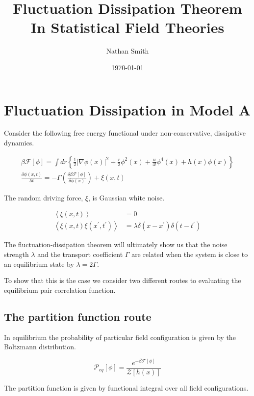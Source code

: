 \documentclass[11pt]{article}
\title{\textbf{Fluctuation Dissipation Theorem In Statistical Field Theories}}
\author{Nathan Smith}
\date{\today}
\newcommand{\F}{\mathcal{F}}
\newcommand{\f}{\frac}
\renewcommand{\l}{\left}
\renewcommand{\r}{\right}
\begin{document}
\maketitle
\tableofcontents

\section{Fluctuation Dissipation in Model A}

Consider the following free energy functional under non-conservative, dissipative dynamics. 

\begin{gather}
\beta \F[\phi] = \int dr \left\lbrace \f{1}{2}\vert \nabla \phi(x) \vert^2 + \f{r}{2}\phi^2(x) + \f{u}{4!}\phi^4(x)  + h(x)\phi(x)\right\rbrace \\
\f{\partial \phi(x,t)}{\partial t} = -\Gamma \left(\f{\delta \beta \F[\phi]}{\delta \phi(x)}\right) + \xi(x, t) 
\end{gather}

The random driving force, $\xi$, is Gaussian white noise. 

\begin{align}
\l\langle \xi (x, t) \r\rangle &= 0 \\
\l\langle \xi (x, t) \xi(x^\prime, t^\prime) \r\rangle  &= \lambda \delta(x - x^\prime) \delta (t - t^\prime)
\end{align}

The fluctuation-dissipation theorem will ultimately show us that the noise strength $\lambda$ and the transport coefficient $\Gamma$ are related when the system is close to an equilibrium state by $\lambda = 2\Gamma$.

To show that this is the case we consider two different routes to evaluating the equilibrium pair correlation function. 

\subsection{The partition function route}

In equilibrium the probability of particular field configuration is given by the Boltzmann distribution. 

\begin{equation}
\mathcal{P}_{eq}[\phi] = \f{e^{-\beta\F[\phi]}}{\mathcal{Z}[h(x)]}
\end{equation}

The partition function is given by functional integral over all field configurations. 
\end{document}
